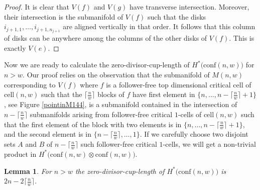 \documentclass[pagebackref,colorlinks,citecolor=blue,linkcolor=blue,urlcolor=blue,filecolor=blue]{article}
\newtheorem{lem}[thm]{Lemma}
\theoremstyle{definition}\newtheorem{definition}[thm]{Definition}
\theoremstyle{definition}
\begin{document}
\begin{proof}
It is clear that $V(f)$ and $V(g)$ have transverse intersection.
Moreover, their intersection is the submanifold of $V(f)$ such that the disks $i_{j+1, 1}, \dots, i_{j+1, n_{j+1}}$ are aligned vertically in that order.
It follows that this column of disks can be anywhere among the columns of the other disks of $V(f)$. 
This is exactly $V(e)$.
\end{proof}

Now we are ready to calculate the zero-divisor-cup-length of $H^{*}\big(\text{conf}(n,w)\big)$ for $n>w$.
Our proof relies on the observation that the submanifold of $M(n,w)$ corresponding to $V(f)$ where $f$ is a follower-free top dimensional critical cell of $\text{cell}(n,w)$ such that the $\big\lceil\frac{n}{w}\big\rceil$ blocks of $f$ have first element in $\big\{n,\dots, n-\big\lceil\frac{n}{w}\big\rceil+1\big\}$, see Figure \ref{pointinM144}, is a submanifold contained in the intersection of $n-\big\lceil\frac{n}{w}\big\rceil$ submanifolds arising from follower-free critical $1$-cells of $\text{cell}(n,w)$ such that the first element of the block with two elements is in $\big\{n,\dots, n-\big\lceil\frac{n}{w}\big\rceil+1\big\}$, and the second element is in $\big\{n-\big\lceil\frac{n}{w}\big\rceil,\dots, 1\big\}$.
If we carefully choose two disjoint sets $A$ and $B$ of $n-\big\lceil\frac{n}{w}\big\rceil$ such follower-free critical $1$-cells, we will get a non-trivial product in $H^{*}\big(\text{conf}(n,w)\otimes\text{conf}(n,w)\big)$.

\begin{lem}\label{cup divisor cup length for all w}
For $n>w$ the zero-divisor-cup-length of $H^{*}\big(\text{conf}(n,w)\big)$ is $2n-2\big\lceil\frac{n}{w}\big\rceil$.
\end{lem}
\end{document}
